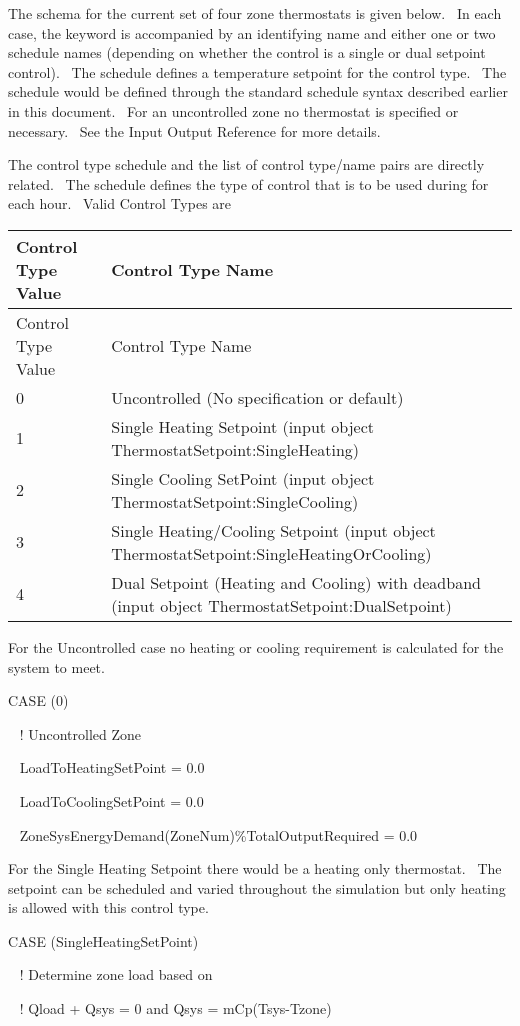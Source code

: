 The schema for the current set of four zone thermostats is given below.~ In each case, the keyword is accompanied by an identifying name and either one or two schedule names (depending on whether the control is a single or dual setpoint control).~ The schedule defines a temperature setpoint for the control type.~ The schedule would be defined through the standard schedule syntax described earlier in this document.~ For an uncontrolled zone no thermostat is specified or necessary.~ See the Input Output Reference for more details.

The control type schedule and the list of control type/name pairs are directly related.~ The schedule defines the type of control that is to be used during for each hour.~ Valid Control Types are

\begin{longtable}[c]{p{1.5in}p{4.5in}}
\toprule 
Control Type Value & Control Type Name \tabularnewline
\midrule
\endfirsthead

\toprule 
Control Type Value & Control Type Name \tabularnewline
\midrule
\endhead

0 & Uncontrolled (No specification or default) \tabularnewline
1 & Single Heating Setpoint (input object ThermostatSetpoint:SingleHeating) \tabularnewline
2 & Single Cooling SetPoint (input object ThermostatSetpoint:SingleCooling) \tabularnewline
3 & Single Heating/Cooling Setpoint (input object ThermostatSetpoint:SingleHeatingOrCooling) \tabularnewline
4 & Dual Setpoint (Heating and Cooling) with deadband (input object ThermostatSetpoint:DualSetpoint) \tabularnewline
\bottomrule
\end{longtable}

For the Uncontrolled case no heating or cooling requirement is calculated for the system to meet.

CASE (0)

~ ! Uncontrolled Zone

~ LoadToHeatingSetPoint = 0.0

~ LoadToCoolingSetPoint = 0.0

~ ZoneSysEnergyDemand(ZoneNum)\%TotalOutputRequired = 0.0

For the Single Heating Setpoint there would be a heating only thermostat.~ The setpoint can be scheduled and varied throughout the simulation but only heating is allowed with this control type.

CASE (SingleHeatingSetPoint)

~ ! Determine zone load based on

~ ! Qload + Qsys = 0 and Qsys = mCp(Tsys-Tzone)

